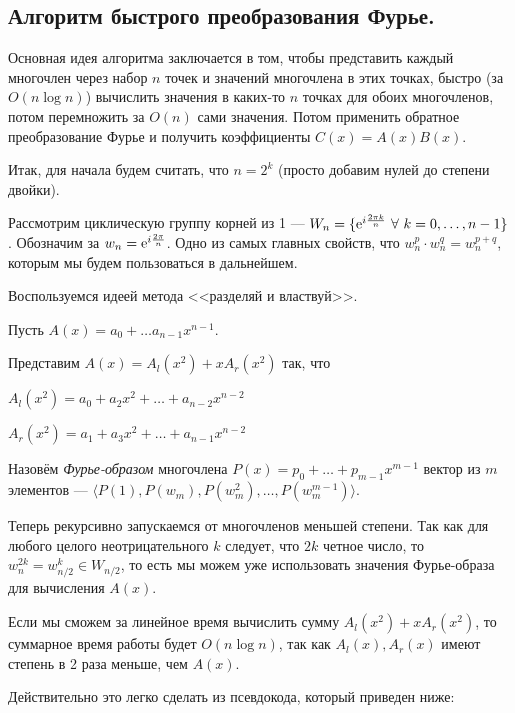 \documentclass[a4paper, 12pt]{article}
\begin{document}
\subsection{Алгоритм быстрого преобразования Фурье.}

Основная идея алгоритма заключается в том, чтобы представить каждый многочлен
через набор $n$ точек и значений многочлена в этих точках, быстро (за $O(n\log n)$) вычислить значения в каких-то $n$ точках для обоих многочленов, потом
перемножить за $O(n)$ сами значения. Потом применить обратное преобразование
Фурье и получить коэффициенты $C(x) = A(x)B(x)$.

Итак, для начала будем считать, что $n = 2^k$ (просто добавим нулей до степени двойки).

Рассмотрим циклическую группу корней из 1 --- $W_n = \{\e^{i\frac{2\pi k}{n}} \ 
\forall \ k = 0, \ldots, n - 1\}$. Обозначим за $w_n = \mathrm{e}^{i\frac{2\pi}{n}}$.
Одно из самых главных свойств, что $w_n^{p} \cdot w_n^{q} = w_n^{p + q}$,
которым мы будем пользоваться в дальнейшем.

Воспользуемся идеей метода <<разделяй и властвуй>>.

Пусть $A(x) = a_0 + \ldots a_{n - 1}x^{n - 1}$.

Представим $A(x) = A_l(x^2) + xA_r(x^2)$ так, что

\begin{center}
  $A_l(x^2) = a_0 + a_2x^2 + \ldots + a_{n - 2}x^{n - 2}$

  $A_r(x^2) = a_1 + a_3x^2 + \ldots + a_{n - 1}x^{n - 2}$
\end{center}

\begin{Def}
  \rm{Назовём \textit{Фурье-образом} многочлена $P(x) = p_0 + \ldots + 
  p_{m - 1}x^{m - 1}$ вектор из $m$ элементов ---  $\langle P(1), P(w_m), P(w_m^2), \ldots, P(w_m^{m - 1}) \rangle$.}
\end{Def}

Теперь рекурсивно запускаемся от многочленов меньшей степени. Так как для 
любого целого неотрицательного $k$ следует, что $2k$ четное число, то $w_n^{2k} = w_{n/2}^k \in W_{n/2}$,
то есть мы можем уже использовать значения Фурье-образа для вычисления $A(x)$.

Если мы сможем за линейное время вычислить сумму $A_l(x^2) + xA_r(x^2)$, то
суммарное время работы будет $O(n\log n)$, так как $A_l(x), A_r(x)$ имеют степень
в 2 раза меньше, чем $A(x)$.

Действительно это легко сделать из псевдокода, который приведен ниже:
\end{document}
